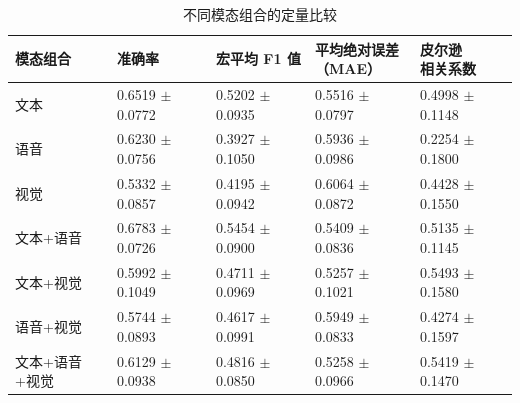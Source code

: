 \begin{table}[htbp]
\centering
\caption{不同模态组合的定量比较}
\label{tab:q1_modality_ablation}
\setlength{\tabcolsep}{2pt}
\begin{tabular}{@{}p{3.3cm}*{4}{>{\centering\arraybackslash}p{3.0cm}}@{}}
\toprule
模态组合 & 准确率 & 宏平均 F1 值 & \shortstack{平均绝对误差\\（MAE）} & \shortstack{皮尔逊\\相关系数} \\
\midrule
文本 & \shortstack{0.6519\\$\pm$ 0.0772} & \shortstack{0.5202\\$\pm$ 0.0935} & \shortstack{0.5516\\$\pm$ 0.0797} & \shortstack{0.4998\\$\pm$ 0.1148} \\
语音 & \shortstack{0.6230\\$\pm$ 0.0756} & \shortstack{0.3927\\$\pm$ 0.1050} & \shortstack{0.5936\\$\pm$ 0.0986} & \shortstack{0.2254\\$\pm$ 0.1800} \\
视觉 & \shortstack{0.5332\\$\pm$ 0.0857} & \shortstack{0.4195\\$\pm$ 0.0942} & \shortstack{0.6064\\$\pm$ 0.0872} & \shortstack{0.4428\\$\pm$ 0.1550} \\
文本+语音 & \shortstack{0.6783\\$\pm$ 0.0726} & \shortstack{0.5454\\$\pm$ 0.0900} & \shortstack{0.5409\\$\pm$ 0.0836} & \shortstack{0.5135\\$\pm$ 0.1145} \\
文本+视觉 & \shortstack{0.5992\\$\pm$ 0.1049} & \shortstack{0.4711\\$\pm$ 0.0969} & \shortstack{0.5257\\$\pm$ 0.1021} & \shortstack{0.5493\\$\pm$ 0.1580} \\
语音+视觉 & \shortstack{0.5744\\$\pm$ 0.0893} & \shortstack{0.4617\\$\pm$ 0.0991} & \shortstack{0.5949\\$\pm$ 0.0833} & \shortstack{0.4274\\$\pm$ 0.1597} \\
文本+语音+视觉 & \shortstack{0.6129\\$\pm$ 0.0938} & \shortstack{0.4816\\$\pm$ 0.0850} & \shortstack{0.5258\\$\pm$ 0.0966} & \shortstack{0.5419\\$\pm$ 0.1470} \\
\bottomrule
\end{tabular}
\end{table}
